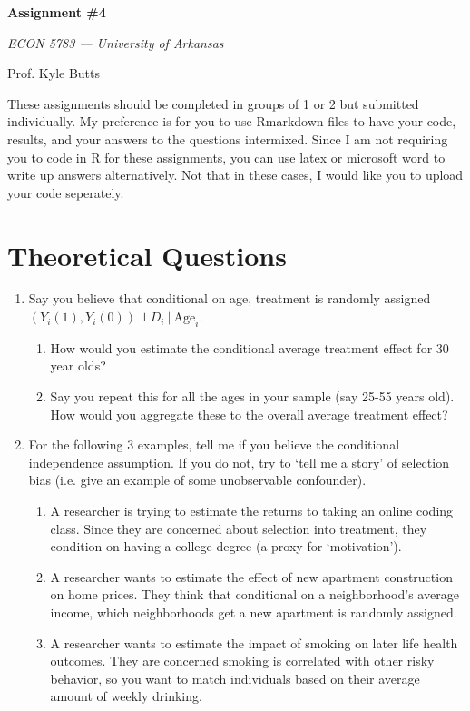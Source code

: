 \documentclass[12pt]{article}
\begin{document}
\begin{center}
  {\Huge\bf Assignment \#4}
  
  \smallskip
  {\large\it  ECON 5783 — University of Arkansas}

  \medskip
  {\large Prof. Kyle Butts}
\end{center}

These assignments should be completed in groups of 1 or 2 but submitted individually. My preference is for you to use Rmarkdown files to have your code, results, and your answers to the questions intermixed. Since I am not requiring you to code in R for these assignments, you can use latex or microsoft word to write up answers alternatively. Not that in these cases, I would like you to upload your code seperately. 


\section*{Theoretical Questions}

\begin{enumerate}
  \item Say you believe that conditional on age, treatment is randomly assigned $(Y_i(1), Y_i(0)) \Perp D_i \ |\ \text{Age}_i$. 
  \begin{enumerate}
    \item How would you estimate the conditional average treatment effect for 30 year olds?
    
    \item Say you repeat this for all the ages in your sample (say 25-55 years old). How would you aggregate these to the overall average treatment effect?
  \end{enumerate}

  \item For the following 3 examples, tell me if you believe the conditional independence assumption. If you do not, try to `tell me a story' of selection bias (i.e. give an example of some unobservable confounder).
  \begin{enumerate}
    \item A researcher is trying to estimate the returns to taking an online coding class. Since they are concerned about selection into treatment, they condition on having a college degree (a proxy for `motivation').
 
    \item A researcher wants to estimate the effect of new apartment construction on home prices. They think that conditional on a neighborhood's average income, which neighborhoods get a new apartment is randomly assigned.
    
    \item A researcher wants to estimate the impact of smoking on later life health outcomes. They are concerned smoking is correlated with other risky behavior, so you want to match individuals based on their average amount of weekly drinking.
  \end{enumerate}
\end{enumerate}
\end{document}

